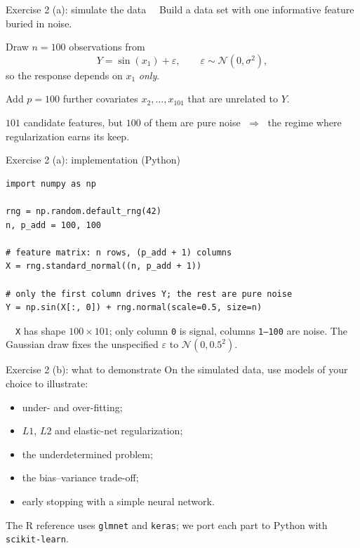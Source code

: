 \documentclass[aspectratio=169]{beamer}
\begin{document}
\begin{frame}{Exercise 2 (a): simulate the data}
	\ \ Build a data set with one informative feature buried in noise.

	\bigskip
	Draw $n = 100$ observations from
	\[
		Y = \sin(x_1) + \varepsilon, \qquad \varepsilon \sim \mathcal{N}(0, \sigma^2),
	\]
	so the response depends on $x_1$ \emph{only}.

	\bigskip
	Add $p = 100$ further covariates $x_2, \ldots, x_{101}$ that are unrelated to $Y$.

	\bigskip
	{\setlength{\fboxsep}{6pt}\colorbox{black!8}{\parbox{0.92\textwidth}{\centering\footnotesize
	$101$ candidate features, but $100$ of them are pure noise $\;\Longrightarrow\;$ the regime where regularization earns its keep.}}}
\end{frame}

\begin{frame}[fragile]{Exercise 2 (a): implementation (Python)}
	\begin{lstlisting}[style=pystyle]
import numpy as np

rng = np.random.default_rng(42)
n, p_add = 100, 100

# feature matrix: n rows, (p_add + 1) columns
X = rng.standard_normal((n, p_add + 1))

# only the first column drives Y; the rest are pure noise
Y = np.sin(X[:, 0]) + rng.normal(scale=0.5, size=n)
\end{lstlisting}

	\smallskip
	\footnotesize
	\structure{$\blacktriangleright$}\ \ \texttt{X} has shape $100 \times 101$; only column \texttt{0} is signal, columns \texttt{1--100} are noise. The Gaussian draw fixes the unspecified $\varepsilon$ to $\mathcal{N}(0, 0.5^2)$.
\end{frame}

\begin{frame}{Exercise 2 (b): what to demonstrate}
	On the simulated data, use models of your choice to illustrate:
	\begin{itemize}
		\item under- and over-fitting;
		\item $L1$, $L2$ and elastic-net regularization;
		\item the underdetermined problem;
		\item the bias--variance trade-off;
		\item early stopping with a simple neural network.
	\end{itemize}
	\bigskip
	{\setlength{\fboxsep}{6pt}\colorbox{black!8}{\parbox{0.92\textwidth}{\centering\footnotesize
	The R reference uses \texttt{glmnet} and \texttt{keras}; we port each part to Python with \texttt{scikit-learn}.}}}
\end{frame}
\end{document}
